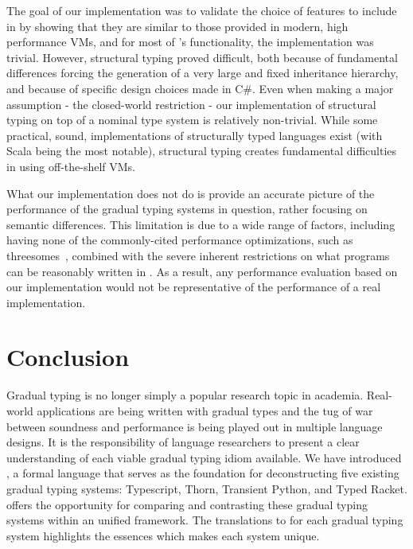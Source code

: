 \documentclass[acmlarge, anonymous, authordraft]{acmart}
\begin{document}
The goal of our implementation was to validate the choice of features to
include in \kafka by showing that they are similar to those provided in
modern, high performance VMs, and for most of \kafka's functionality, the
implementation was trivial. However, structural typing proved difficult, both
because of fundamental differences forcing the generation of a very large and
fixed inheritance hierarchy, and because of specific design choices made in
C\#. Even when making a major assumption - the closed-world restriction - our
implementation of structural typing on top of a nominal type system is
relatively non-trivial. While some practical, sound, implementations of
structurally typed languages exist (with Scala being the most notable),
structural typing creates fundamental difficulties in using off-the-shelf VMs.

What our implementation does not do is provide an accurate picture of the
performance of the gradual typing systems in question, rather focusing on
semantic differences. This limitation is due to a wide range of factors,
including having none of the commonly-cited performance optimizations, such as
threesomes~\cite{siek10}, combined with the severe inherent restrictions on
what programs can be reasonably written in \kafka. As a result, any
performance evaluation based on our \kafka implementation would not be
representative of the performance of a real implementation. %

\section{Conclusion}

Gradual typing is no longer simply a popular research topic in academia.
Real-world applications are being written with gradual types and the tug of
war between soundness and performance is being played out in multiple
language designs.  It is the responsibility of language researchers to
present a clear understanding of each viable gradual typing idiom available.
We have introduced \kafka, a formal language that serves as the foundation
for deconstructing five existing gradual typing systems: Typescript, Thorn,
Transient Python, and Typed Racket.
\kafka offers the
opportunity for comparing and contrasting these gradual typing systems
within an unified framework. The translations to \kafka for each gradual
typing system highlights the essences which makes each system unique.




\end{document}
